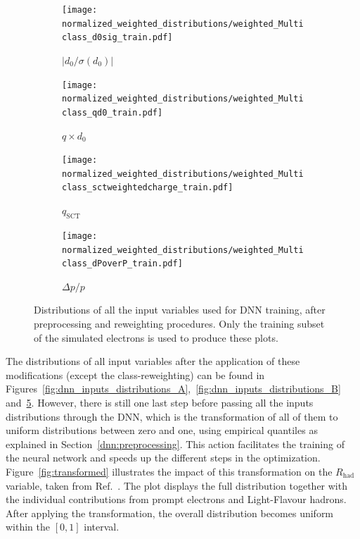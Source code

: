 \begin{figure}[htbp]
  \centering

  \begin{subfigure}[b]{0.49\textwidth}
    \centering
    \texttt{[image: normalized\_weighted\_distributions/weighted\_Multiclass\_d0sig\_train.pdf]}
    \caption{$|d_0/\sigma(d_0)|$}
    \label{fig:input16}
  \end{subfigure}\hfill
  \begin{subfigure}[b]{0.49\textwidth}
    \centering
    \texttt{[image: normalized\_weighted\_distributions/weighted\_Multiclass\_qd0\_train.pdf]}
    \caption{$q \times d_0$}
    \label{fig:input14}
  \end{subfigure}

  \vspace{0.45cm}

  \begin{subfigure}[b]{0.49\textwidth}
    \centering
    \texttt{[image: normalized\_weighted\_distributions/weighted\_Multiclass\_sctweightedcharge\_train.pdf]}
    \caption{$q_{\text{SCT}}$}
    \label{fig:input15}
  \end{subfigure}\hfill
  \begin{subfigure}[b]{0.49\textwidth}
    \centering
    \texttt{[image: normalized\_weighted\_distributions/weighted\_Multiclass\_dPoverP\_train.pdf]}
    \caption{$\Delta p/p$}
    \label{fig:input17}
  \end{subfigure}

  \caption{Distributions of all the input variables used for DNN training, after preprocessing and reweighting procedures. Only the training subset of the simulated electrons is used to produce these plots.}
  \label{fig:dnn_inputs_distributions_C}
\end{figure}

The distributions of all input variables after the application of these modifications (except the class-reweighting) can be found in Figures~\ref{fig:dnn_inputs_distributions_A},~\ref{fig:dnn_inputs_distributions_B} and~\ref{fig:dnn_inputs_distributions_C}. However, there is still one last step before passing all the inputs distributions through the DNN, which is the transformation of all of them to uniform distributions between zero and one, using empirical quantiles as explained in Section~\ref{dnn:preprocessing}. This action facilitates the training of the neural network and speeds up the different steps in the optimization.
Figure~\ref{fig:transformed} illustrates the impact of this transformation on the $R_{\text{had}}$ variable, taken from Ref.~\cite{dnn_paper}. The plot displays the full distribution together with the individual contributions from prompt electrons and Light-Flavour hadrons. After applying the transformation, the overall distribution becomes uniform within the $[0,1]$ interval.

